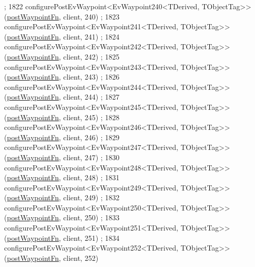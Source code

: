 \begin{DoxyCode}
      ;
1822     configurePostEvWaypoint<EvWaypoint240<TDerived, TObjectTag>>(\hyperlink{classcl__move__base__z_1_1WaypointEventDispatcher_a964a57fcce5d48ec60243230722d8dd7}{postWaypointFn}, client, 240)
      ;
1823     configurePostEvWaypoint<EvWaypoint241<TDerived, TObjectTag>>(\hyperlink{classcl__move__base__z_1_1WaypointEventDispatcher_a964a57fcce5d48ec60243230722d8dd7}{postWaypointFn}, client, 241)
      ;
1824     configurePostEvWaypoint<EvWaypoint242<TDerived, TObjectTag>>(\hyperlink{classcl__move__base__z_1_1WaypointEventDispatcher_a964a57fcce5d48ec60243230722d8dd7}{postWaypointFn}, client, 242)
      ;
1825     configurePostEvWaypoint<EvWaypoint243<TDerived, TObjectTag>>(\hyperlink{classcl__move__base__z_1_1WaypointEventDispatcher_a964a57fcce5d48ec60243230722d8dd7}{postWaypointFn}, client, 243)
      ;
1826     configurePostEvWaypoint<EvWaypoint244<TDerived, TObjectTag>>(\hyperlink{classcl__move__base__z_1_1WaypointEventDispatcher_a964a57fcce5d48ec60243230722d8dd7}{postWaypointFn}, client, 244)
      ;
1827     configurePostEvWaypoint<EvWaypoint245<TDerived, TObjectTag>>(\hyperlink{classcl__move__base__z_1_1WaypointEventDispatcher_a964a57fcce5d48ec60243230722d8dd7}{postWaypointFn}, client, 245)
      ;
1828     configurePostEvWaypoint<EvWaypoint246<TDerived, TObjectTag>>(\hyperlink{classcl__move__base__z_1_1WaypointEventDispatcher_a964a57fcce5d48ec60243230722d8dd7}{postWaypointFn}, client, 246)
      ;
1829     configurePostEvWaypoint<EvWaypoint247<TDerived, TObjectTag>>(\hyperlink{classcl__move__base__z_1_1WaypointEventDispatcher_a964a57fcce5d48ec60243230722d8dd7}{postWaypointFn}, client, 247)
      ;
1830     configurePostEvWaypoint<EvWaypoint248<TDerived, TObjectTag>>(\hyperlink{classcl__move__base__z_1_1WaypointEventDispatcher_a964a57fcce5d48ec60243230722d8dd7}{postWaypointFn}, client, 248)
      ;
1831     configurePostEvWaypoint<EvWaypoint249<TDerived, TObjectTag>>(\hyperlink{classcl__move__base__z_1_1WaypointEventDispatcher_a964a57fcce5d48ec60243230722d8dd7}{postWaypointFn}, client, 249)
      ;
1832     configurePostEvWaypoint<EvWaypoint250<TDerived, TObjectTag>>(\hyperlink{classcl__move__base__z_1_1WaypointEventDispatcher_a964a57fcce5d48ec60243230722d8dd7}{postWaypointFn}, client, 250)
      ;
1833     configurePostEvWaypoint<EvWaypoint251<TDerived, TObjectTag>>(\hyperlink{classcl__move__base__z_1_1WaypointEventDispatcher_a964a57fcce5d48ec60243230722d8dd7}{postWaypointFn}, client, 251)
      ;
1834     configurePostEvWaypoint<EvWaypoint252<TDerived, TObjectTag>>(\hyperlink{classcl__move__base__z_1_1WaypointEventDispatcher_a964a57fcce5d48ec60243230722d8dd7}{postWaypointFn}, client, 252)

\end{DoxyCode}

